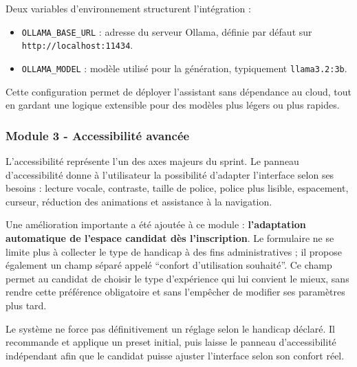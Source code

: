 \documentclass[12pt,a4paper]{report}
\begin{document}
\begin{infobox}
Deux variables d'environnement structurent l'intégration :
\begin{itemize}
  \item \texttt{OLLAMA\_BASE\_URL} : adresse du serveur Ollama, définie par défaut sur \texttt{http://localhost:11434}.
  \item \texttt{OLLAMA\_MODEL} : modèle utilisé pour la génération, typiquement \texttt{llama3.2:3b}.
\end{itemize}
Cette configuration permet de déployer l'assistant sans dépendance au cloud, tout en gardant une logique extensible pour des modèles plus légers ou plus rapides.
\end{infobox}

\subsubsection{Module 3 - Accessibilité avancée}

L'accessibilité représente l'un des axes majeurs du sprint. Le panneau d'accessibilité donne à l'utilisateur la possibilité d'adapter l'interface selon ses besoins : lecture vocale, contraste, taille de police, police plus lisible, espacement, curseur, réduction des animations et assistance à la navigation.

Une amélioration importante a été ajoutée à ce module : \textbf{l'adaptation automatique de l'espace candidat dès l'inscription}. Le formulaire ne se limite plus à collecter le type de handicap à des fins administratives ; il propose également un champ séparé appelé \enquote{confort d'utilisation souhaité}. Ce champ permet au candidat de choisir le type d'expérience qui lui convient le mieux, sans rendre cette préférence obligatoire et sans l'empêcher de modifier ses paramètres plus tard.

\begin{infobox}
Le système ne force pas définitivement un réglage selon le handicap déclaré. Il recommande et applique un preset initial, puis laisse le panneau d'accessibilité indépendant afin que le candidat puisse ajuster l'interface selon son confort réel.
\end{infobox}
\end{document}
